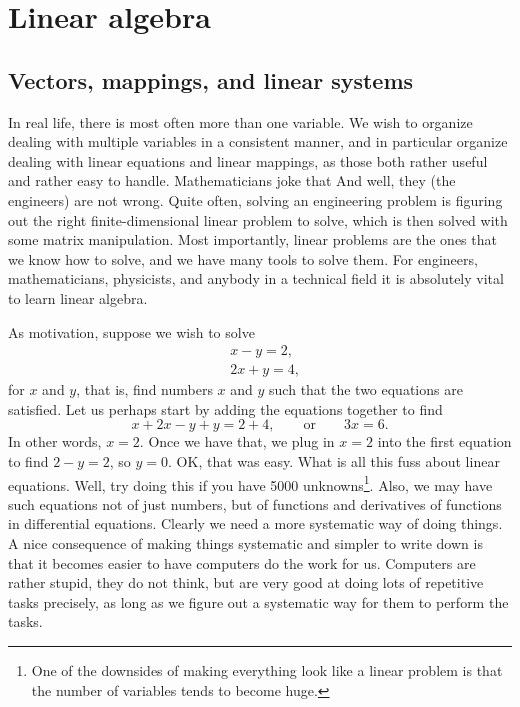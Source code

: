 \chapter{Linear algebra} \label{linalg:appendix}


\section{Vectors, mappings, and linear systems}
\label{vecsandmaps:section}


In real life, there is most often more than one variable.
We wish to organize dealing with multiple variables in a consistent
manner, and in particular organize dealing with linear equations and linear
mappings, as those both rather useful and rather easy to handle.
Mathematicians joke that
And well, they (the engineers) are not wrong. 
Quite often, solving an engineering problem is figuring out the
right finite-dimensional linear problem to solve, which is then
solved with some matrix manipulation.
Most importantly, linear problems are the ones that we know how to solve,
and we have many tools to solve them.
For engineers, mathematicians, physicists, and anybody in a technical
field it is absolutely vital to learn linear algebra.

As motivation, suppose we wish to solve
\begin{equation*}
\begin{aligned}
& x-y = 2 , \\
& 2x+y = 4 ,
\end{aligned}
\end{equation*}
for $x$ and $y$, that is, find numbers $x$ and $y$ such that the two
equations are satisfied.
Let us perhaps start by adding the equations together to find
\begin{equation*}
x+2x-y+y = 2+4, \qquad \text{or} \qquad 3x = 6 .
\end{equation*}
In other words, $x=2$.  Once we have that, we plug in $x=2$ into the
first equation to find $2-y=2$, so $y=0$.  OK\@, that was easy.  What is all
this fuss about linear equations.  Well, try doing this if you have
5000 unknowns\footnote{One of the downsides of making everything look like a
linear problem is that the number of variables tends to become huge.}.
Also, we may have such equations not of just numbers,
but of functions and derivatives of functions in differential equations.
Clearly we need a more systematic way of doing things.
A nice consequence of making things systematic and simpler to write down
is that it becomes easier to have computers do the work for us.
Computers are rather stupid, they do not think,
but are very good at doing lots of repetitive
tasks precisely, as long as we figure out a systematic way for them to
perform the tasks.

